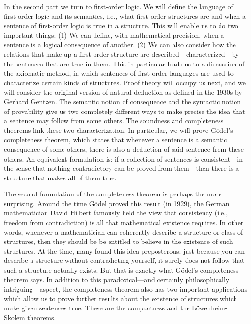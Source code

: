 In the second part we turn to first-order logic. We will define the
language of first-order logic and its semantics, i.e., what first-order
structures are and when a sentence of first-order logic is true in a
structure. This will enable us to do two important things: (1) We can
define, with mathematical precision, when a sentence is a logical
consequence of another. (2) We can also consider how the relations
that make up a first-order structure are
described---characterized---by the sentences that are true in them.
This in particular leads us to a discussion of the axiomatic method,
in which sentences of first-order languages are used to characterize
certain kinds of structures. Proof theory will occupy us next, and we
will consider the original version of natural deduction as defined in
the 1930s by Gerhard Gentzen. The semantic notion of consequence and
the syntactic notion of provability give us two completely different
ways to make precise the idea that a sentence may follow from some
others. The soundness and completeness theorems link these two
characterization. In particular, we will prove G\"odel's completeness
theorem, which states that whenever a sentence is a semantic
consequence of some others, there is also a deduction of said sentence
from these others. An equivalent formulation is: if a collection of
sentences is consistent---in the sense that nothing contradictory can
be proved from them---then there is a structure that makes all of them
true.

The second formulation of the completeness theorem is perhaps the more
surprising. Around the time G\"odel proved this result (in 1929), the
German mathematician David Hilbert famously held the view that
consistency (i.e., freedom from contradiction) is all that mathematical
existence requires. In other words, whenever a mathematician can
coherently describe a structure or class of structures, then they
should be be entitled to believe in the existence of such structures.
At the time, many found this idea preposterous: just because you can
describe a structure without contradicting yourself, it surely does
not follow that such a structure actually exists. But that is exactly
what G\"odel's completeness theorem says. In addition to this
paradoxical---and certainly philosophically intriguing---aspect, the
completeness theorem also has two important applications which allow
us to prove further results about the existence of structures which
make given sentences true. These are the compactness and the
L\"owenheim-Skolem theorems.

